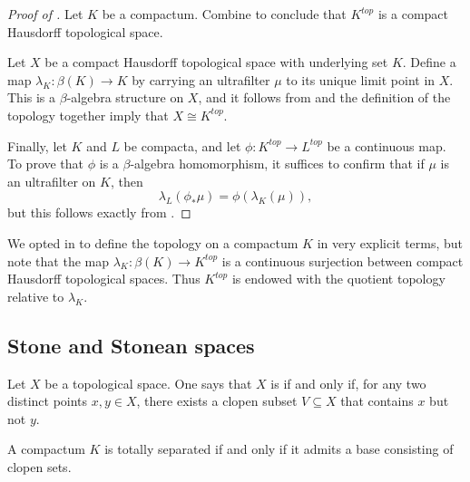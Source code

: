 \begin{proof}[Proof of ]
	Let $ K $ be a compactum.
	Combine  to conclude that $ K^{\textit{top}} $ is a compact Hausdorff topological space.

	Let $ X $ be a compact Hausdorff topological space with underlying set $ K $.
	Define a map $ \lambda_K \colon \beta(K) \to K $ by carrying an ultrafilter $ \mu $ to its unique limit point in $ X $.
	This is a $ \beta $-algebra structure on $ X $, and it follows from  and the definition of the topology together imply that $ X \cong K^{\textit{top}}$.

	Finally, let $ K $ and $ L $ be compacta, and let $ \phi \colon K^{\textit{top}} \to L^{\textit{top}} $ be a continuous map.
	To prove that $ \phi $ is a $ \beta $-algebra homomorphism, it suffices to confirm that if $ \mu $ is an ultrafilter on $ K $, then
	\[
		\lambda_L (\phi_{\ast} \mu) = \phi (\lambda_K(\mu)) \comma
	\]
	but this follows exactly from .
\end{proof}

\begin{nul}
	We opted in  to define the topology on a compactum $ K $ in very explicit terms, but note that the map $ \lambda_K \colon \beta(K) \to K^{\textit{top}} $ is a continuous surjection between compact Hausdorff topological spaces.
	Thus $ K^{\textit{top}} $ is endowed with the quotient topology relative to $ \lambda_K $.
\end{nul}

\subsection{Stone and {S}tonean spaces}

\begin{dfn}
	Let $ X $ be a topological space.
	One says that $ X $ is  if and only if, for any two distinct points $ x, y \in X $, there exists a clopen subset $ V \subseteq X $ that contains $ x $ but not $ y $.
\end{dfn}

\begin{lem}
	A compactum $ K $ is totally separated if and only if it admits a base consisting of clopen sets.
\end{lem}


